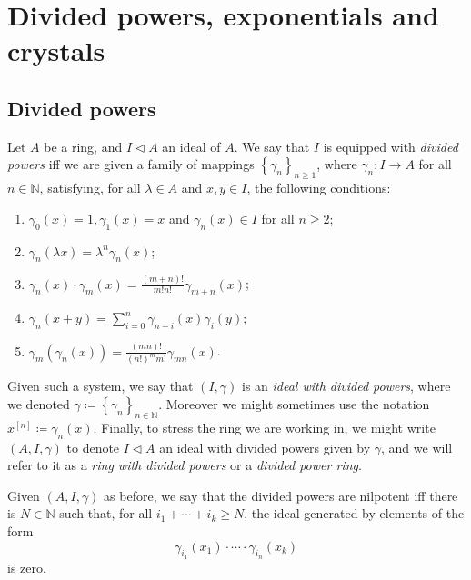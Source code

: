 \documentclass[../Main]{subfiles}
\begin{document}
\section{Divided powers, exponentials and crystals}
\subsection{Divided powers}
\begin{defn}\label{defn:dividedPowers}
	Let $A$ be a ring, and $I \triangleleft A$ an ideal of $A$.
	We say that $I$ is equipped with {\em divided powers} iff
	we are given a family of mappings $\left\{ \gamma_n \right\}_{n \geq 1}$,
	where $\gamma_n\colon I \to A$ for all $n \in \mathbb{N}$,
	satisfying, for all $\lambda \in A$ and $x,y \in I$, the following conditions:
	\begin{enumerate}
		\item $\gamma_0(x) = 1, \gamma_1(x) = x$ and 
			$\gamma_n(x) \in I$ for all $n \geq 2$;
		\item $\gamma_n(\lambda x) = \lambda^n \gamma_n(x)$;
		\item $\gamma_n(x) \cdot \gamma_m(x) =
			\frac{\left( m + n \right)!}{m! n!} \gamma_{m+n}(x)$;
		\item $\gamma_n(x+y) = \sum_{i=0}^{n} \gamma_{n-i}(x) \gamma_i(y)$;
		\item $\gamma_m(\gamma_n(x)) = 
			\frac{\left( mn \right)!}{\left( n! \right)^m m!} \gamma_{mn}(x)$.
	\end{enumerate}
	Given such a system, we say that $(I,\gamma)$
	is an {\em ideal with divided powers},
	where we denoted $\gamma \coloneqq \left\{ \gamma_n \right\}_{n \in \mathbb{N}}$.
	Moreover we might sometimes use the notation
	$x^{[n]} \coloneqq \gamma_n(x)$.
	Finally, to stress the ring we are working in, we might write
	$\left(A, I, \gamma\right)$ to denote $I \triangleleft A$
	an ideal with divided powers given by $\gamma$, and 
	we will refer to it as a {\em ring with divided powers}
	or a {\em divided power ring}.
\end{defn}


\begin{defn}\label{defn:NilpotentDividedPowers}
	Given $\left(A, I, \gamma\right)$ as before, we say that the divided
	powers are nilpotent iff there is $N \in \mathbb{N}$ such that,
	for all $i_1 + \cdots + i_k \geq N$,
	the ideal generated by elements of the form
	\begin{equation*}
		\gamma_{i_1}(x_1) \cdot \cdots \cdot \gamma_{i_n}(x_k)
	\end{equation*}
	is zero.
\end{defn}
\end{document}
